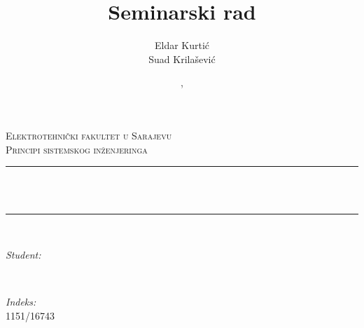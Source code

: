 \documentclass[12pt]{article}
\title{Seminarski rad}                             				%
\author{Eldar Kurtić\\Suad Krilašević}                               %
\date{\MONTH, \the\year}                                           %
\makeatletter
\newcommand{\kurs}{Principi sistemskog inženjeringa}
\newcommand{\indeks}{1151/16743}
\let\thetitle\@title
\let\theauthor\@author
\let\thedate\@date
\makeatother
\begin{document}

\begin{titlepage}
    \centering
    \vspace*{0.5 cm}
    \textsc{\LARGE Elektrotehnički fakultet u Sarajevu}\\[2.0 cm]   
    \textsc{\Large \kurs}\\[0.5 cm]               
    \rule{\linewidth}{0.2 mm} \\[0.4 cm]%
    { \huge \bfseries \thetitle}\\
    \rule{\linewidth}{0.2 mm} \\[1.5 cm]%
    \vfill
    \begin{minipage}{0.4\textwidth}
        \begin{flushleft} \large
            \emph{Student:}\\
            \theauthor
            \end{flushleft}
            \end{minipage}~
            \begin{minipage}{0.4\textwidth}
            \begin{flushright} \large
            \emph{Indeks:} \\
            \indeks                                   
        \end{flushright}
    \end{minipage}\\[2 cm]
    
    {\large \thedate}\\[2 cm]

    
\end{titlepage}


\tableofcontents
\pagebreak



\end{document}
